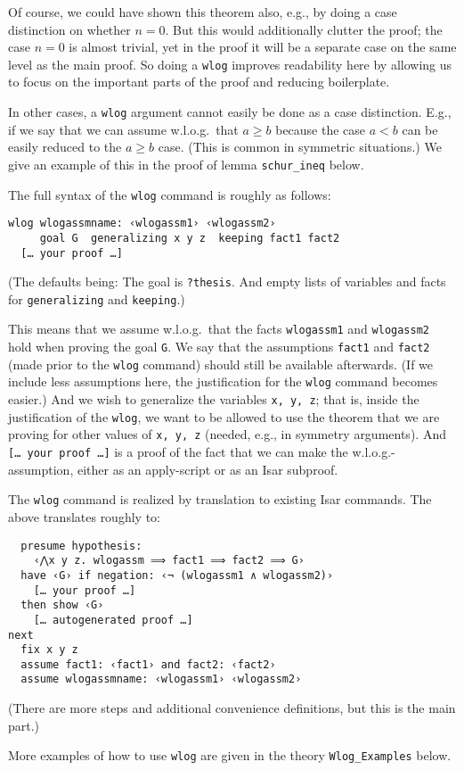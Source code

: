 \documentclass[11pt,a4paper]{article}
\begin{document}
Of course, we could have shown this theorem also, e.g., by doing a case distinction on whether $n=0$.
But this would additionally clutter the proof; the case $n=0$ is almost trivial, yet in the proof it will be a separate case on the same level as the main proof.
So doing a \texttt{wlog} improves readability here by allowing us to focus on the important parts of the proof
and reducing boilerplate.

In other cases, a \texttt{wlog} argument cannot easily be done as a case distinction.
E.g., if we say that we can assume w.l.o.g.~that $a\geq b$ because the case $a < b$ can be easily reduced to the $a\geq b$ case.
(This is common in symmetric situations.)
We give an example of this in the proof of lemma \verb|schur_ineq| below.

\bigskip

The full syntax of the \texttt{wlog} command is roughly as follows:
\begin{verbatim}
wlog wlogassmname: ‹wlogassm1› ‹wlogassm2›
     goal G  generalizing x y z  keeping fact1 fact2
  [… your proof …]
\end{verbatim}
(The defaults being: The goal is \texttt{?thesis}.
And empty lists of variables and facts for \texttt{generalizing} and \texttt{keeping}.)

This means that we assume w.l.o.g.~that the facts \texttt{wlogassm1} and \texttt{wlogassm2} hold
when proving the goal \texttt{G}.
We say that the assumptions \texttt{fact1} and \texttt{fact2} (made prior to the \texttt{wlog} command)
should still be available afterwards.
(If we include less assumptions here, the justification for the \texttt{wlog} command becomes easier.)
And we wish to generalize the variables \texttt{x, y, z};
that is, inside the justification of the \texttt{wlog}, we want to be allowed to use the theorem that we are proving
for other values of \texttt{x, y, z} (needed, e.g., in symmetry arguments).
And \texttt{[… your proof …]} is a proof of the fact that we can make the w.l.o.g.-assumption,
either as an apply-script or as an Isar subproof.

\bigskip

The \texttt{wlog} command is realized by translation to existing Isar commands. The above translates roughly to:
\begin{verbatim}
  presume hypothesis:
    ‹⋀x y z. wlogassm ⟹ fact1 ⟹ fact2 ⟹ G›
  have ‹G› if negation: ‹¬ (wlogassm1 ∧ wlogassm2)›
    [… your proof …]
  then show ‹G›
    [… autogenerated proof …]
next
  fix x y z
  assume fact1: ‹fact1› and fact2: ‹fact2›
  assume wlogassmname: ‹wlogassm1› ‹wlogassm2›
\end{verbatim}
(There are more steps and additional convenience definitions, but this is the main part.)

More examples of how to use \texttt{wlog} are given in the theory \texttt{Wlog\_Examples} below.





\end{document}
